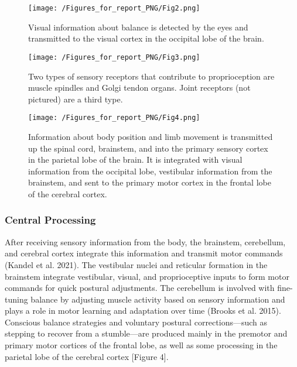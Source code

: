 \documentclass[
  letterpaper,
  DIV=11,
  numbers=noendperiod]{scrartcl}
\begin{document}
\begin{figure}[H]

{\centering \texttt{[image: /Figures\_for\_report\_PNG/Fig2.png]}

}

\caption{Visual information about balance is detected by the eyes and
transmitted to the visual cortex in the occipital lobe of the brain.}

\end{figure}%
\begin{figure}[H]

{\centering \texttt{[image: /Figures\_for\_report\_PNG/Fig3.png]}

}

\caption{Two types of sensory receptors that contribute to
proprioception are muscle spindles and Golgi tendon organs. Joint
receptors (not pictured) are a third type.}

\end{figure}%
\begin{figure}[H]

{\centering \texttt{[image: /Figures\_for\_report\_PNG/Fig4.png]}

}

\caption{Information about body position and limb movement is
transmitted up the spinal cord, brainstem, and into the primary sensory
cortex in the parietal lobe of the brain. It is integrated with visual
information from the occipital lobe, vestibular information from the
brainstem, and sent to the primary motor cortex in the frontal lobe of
the cerebral cortex.}

\end{figure}%

\subsubsection{Central Processing}\label{central-processing}

After receiving sensory information from the body, the brainstem,
cerebellum, and cerebral cortex integrate this information and transmit
motor commands (Kandel et al. 2021). The vestibular nuclei and reticular
formation in the brainstem integrate vestibular, visual, and
proprioceptive inputs to form motor commands for quick postural
adjustments. The cerebellum is involved with fine-tuning balance by
adjusting muscle activity based on sensory information and plays a role
in motor learning and adaptation over time (Brooks et al. 2015).
Conscious balance strategies and voluntary postural corrections---such
as stepping to recover from a stumble---are produced mainly in the
premotor and primary motor cortices of the frontal lobe, as well as some
processing in the parietal lobe of the cerebral cortex {[}Figure 4{]}.
\end{document}
